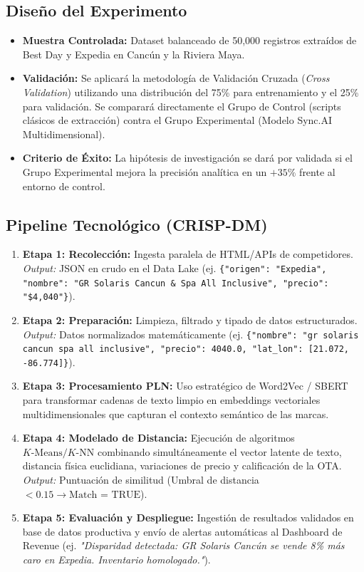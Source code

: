 \documentclass[11pt,a4paper]{article}
\begin{document}
\subsection{Diseño del Experimento}
\begin{itemize}[leftmargin=*]
    \item \textbf{Muestra Controlada:} Dataset balanceado de 50,000 registros extraídos de Best Day y Expedia en Cancún y la Riviera Maya.
    \item \textbf{Validación:} Se aplicará la metodología de Validación Cruzada (\textit{Cross Validation}) utilizando una distribución del 75\% para entrenamiento y el 25\% para validación. Se comparará directamente el Grupo de Control (scripts clásicos de extracción) contra el Grupo Experimental (Modelo Sync.AI Multidimensional).
    \item \textbf{Criterio de Éxito:} La hipótesis de investigación se dará por validada si el Grupo Experimental mejora la precisión analítica en un $+35\%$ frente al entorno de control.
\end{itemize}

\subsection{Pipeline Tecnológico (CRISP-DM)}
\begin{enumerate}[leftmargin=*]
    \item \textbf{Etapa 1: Recolección:} Ingesta paralela de HTML/APIs de competidores. \textit{Output:} JSON en crudo en el Data Lake (ej. \texttt{\{"origen": "Expedia", "nombre": "GR Solaris Cancun \& Spa All Inclusive", "precio": "\$4,040"\}}).
    \item \textbf{Etapa 2: Preparación:} Limpieza, filtrado y tipado de datos estructurados. \textit{Output:} Datos normalizados matemáticamente (ej. \texttt{\{"nombre": "gr solaris cancun spa all inclusive", "precio": 4040.0, "lat\_lon": [21.072, -86.774]\}}).
    \item \textbf{Etapa 3: Procesamiento PLN:} Uso estratégico de Word2Vec / SBERT para transformar cadenas de texto limpio en embeddings vectoriales multidimensionales que capturan el contexto semántico de las marcas.
    \item \textbf{Etapa 4: Modelado de Distancia:} Ejecución de algoritmos $K\text{-Means} / K\text{-NN}$ combinando simultáneamente el vector latente de texto, distancia física euclidiana, variaciones de precio y calificación de la OTA. \textit{Output:} Puntuación de similitud (Umbral de distancia $< 0.15 \rightarrow \text{Match = TRUE}$).
    \item \textbf{Etapa 5: Evaluación y Despliegue:} Ingestión de resultados validados en base de datos productiva y envío de alertas automáticas al Dashboard de Revenue (ej. \textit{"Disparidad detectada: GR Solaris Cancún se vende 8\% más caro en Expedia. Inventario homologado."}).
\end{enumerate}
\end{document}
